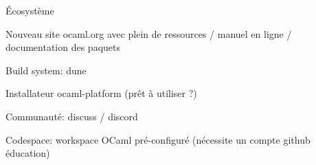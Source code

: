 
\begin{frame}{Écosystème}
    
Nouveau site ocaml.org avec plein de ressources / manuel en ligne / documentation des paquets

Build system: dune
    
Installateur ocaml-platform (prêt à utiliser ?)

Communauté: discuss / discord

Codespace: workspace OCaml pré-configuré (nécessite un compte github éducation)

    
\end{frame}
